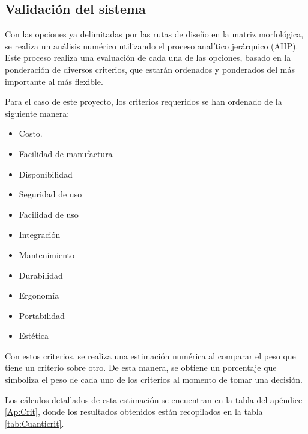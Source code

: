 \subsection{Validación del sistema}

Con las opciones ya delimitadas por las rutas de diseño en la matriz morfológica, se realiza un análisis numérico utilizando el proceso analítico jerárquico (AHP). Este proceso realiza una evaluación de cada una de las opciones, basado en la ponderación de diversos criterios, que estarán ordenados y ponderados del más importante al más flexible.

Para el caso de este proyecto, los criterios requeridos se han ordenado de la siguiente manera:

\begin{itemize}
    \item Costo.
    \item Facilidad de manufactura
    \item Disponibilidad
    \item Seguridad de uso
    \item Facilidad de uso
    \item Integración
    \item Mantenimiento
    \item Durabilidad
    \item Ergonomía
    \item Portabilidad
    \item Estética
\end{itemize}

Con estos criterios, se realiza una estimación numérica al comparar el peso que tiene un criterio sobre otro. De esta manera, se obtiene un porcentaje que simboliza el peso de cada uno de los criterios al momento de tomar una decisión.

Los cálculos detallados de esta estimación se encuentran en la tabla del apéndice \ref{Ap:Crit}, donde los resultados obtenidos están recopilados en la tabla \ref{tab:Cuanticrit}.

